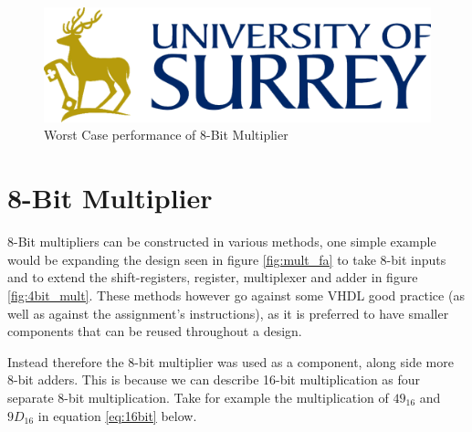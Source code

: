 \documentclass[11pt]{article}
\begin{document}
\begin{figure}[H]        
    \centering
    \includegraphics[width=.5\textwidth]{Logo.png}
    \caption{Worst Case performance of 8-Bit Multiplier}
    \label{fig:4bit_worstcase}
\end{figure} 

\section{8-Bit Multiplier}

8-Bit multipliers can be constructed in various methods, one simple example would be expanding the design seen in figure \ref{fig:mult_fa} to take 8-bit inputs and to extend the shift-registers, register, multiplexer and adder in figure \ref{fig:4bit_mult}.
These methods however go against some VHDL good practice (as well as against the assignment's instructions),
as it is preferred to have smaller components that can be reused throughout a design.

Instead therefore the 8-bit multiplier was used as a component, along side more 8-bit adders. 
This is because we can describe 16-bit multiplication as four separate 8-bit multiplication.
Take for example the multiplication of $49_16$ and $9D_16$ in equation \ref{eq:16bit} below.
\end{document}
